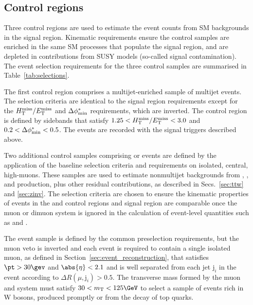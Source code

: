 
\subsection{Control regions}
\label{sec:control}

Three control regions are used to estimate the event counts from SM
backgrounds in the signal region. Kinematic requirements ensure the
control samples are enriched in the same SM processes that populate
the signal region, and are depleted in contributions from SUSY models
(\ie so-called signal contamination). The event selection requirements
for the three control samples are summarised in
Table~\ref{tab:selections}.

The first control region comprises a multijet-enriched sample of
multijet events. The selection criteria are identical to the signal
region requirements except for the $H_{\mathrm{T}}^{\text{miss}} / E_{\mathrm{T}}^{\text{miss}}$ and $\Delta\phi^{*}_\text{min}$
requirements, which are inverted. The control region is defined by
sidebands that satisfy $1.25 < H_{\mathrm{T}}^{\text{miss}} / E_{\mathrm{T}}^{\text{miss}} < 3.0$ and $0.2 < \Delta\phi^{*}_\text{min} <
0.5$. The events are recorded with the signal triggers described
above.

Two additional control samples comprising \mj or \mmj events are
defined by the application of the baseline selection criteria and
requirements on isolated, central, high-\Pt muons. These samples are
used to estimate nonmultijet backgrounds from \wlj, \ttbar, and
\znunuj production, plus other residual contributions, as described in
Secs.~\ref{sec:ttw} and \ref{sec:zinv}. The selection criteria are
chosen to ensure the kinematic properties of events in the \mj and
\mmj control regions and signal region are comparable once the muon or
dimuon system is ignored in the calculation of event-level quantities
such as \scalht and \mht.

The \mj event sample is defined by the common preselection
requirements, but the muon veto is inverted and each event is required
to contain a single isolated muon, as defined in
Section~\ref{sec:event_reconstruction}, that satisfies $\pt > 30\gev$
and $\abs{\eta} < 2.1$ and is well separated from each jet
$\mathrm{j}_i$ in the event according to $\Delta R(\mu,\mathrm{j}_i) >
0.5$. The transverse mass formed by the muon \pt and \ptvecmiss system
must satisfy $30 < m_\mathrm{T} < 125\GeV$ to select a sample of
events rich in W bosons, produced promptly or from the decay of top
quarks.

